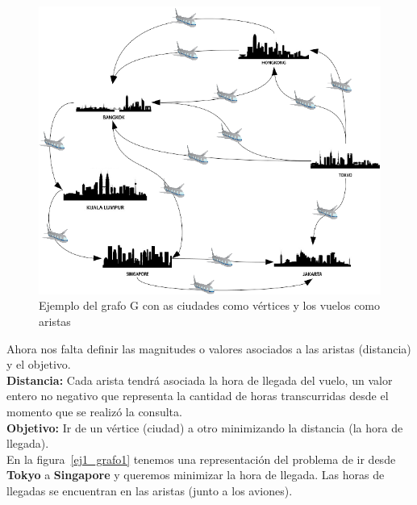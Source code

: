 \begin{figure}[h!]
  \centering
  \includegraphics[scale=0.75]{Imagenes/ej1_grafo0}
  \caption{Ejemplo del grafo G con as ciudades como vértices y los vuelos como aristas}
  \label{ej1_grafo0}
\end{figure}

Ahora nos falta definir las magnitudes o valores asociados a las aristas (distancia) y el objetivo.\\

\indent
\textbf{Distancia:} Cada arista tendrá asociada la hora de llegada del vuelo, un valor entero no negativo que representa la cantidad de horas transcurridas desde el momento que se realizó la consulta. \\
\indent
\textbf{Objetivo:} Ir de un vértice (ciudad) a otro minimizando la distancia (la hora de llegada).\\

En la figura~\ref{ej1_grafo1} tenemos una representación del problema de ir desde \textbf{Tokyo} a 
\textbf{Singapore}  y queremos minimizar la hora de llegada. Las horas de llegadas se encuentran en las aristas (junto a los aviones).\\

